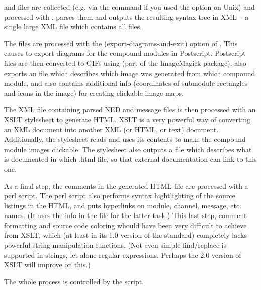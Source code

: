  and  files are collected (e.g. via the 
command if you used the  option on Unix) and processed
with .  parses them and outputs the resulting syntax
tree in XML -- a single large XML file which contains all files.

The  files are processed with the  (export-diagrams-and-exit)
option of . This causes  to export diagrams for the
compound modules in Postscript. Postscript files are then converted
to GIFs using  (part of the ImageMagick package).
 also exports an  file which describes which
image was generated from which compound module, and also contains
additional info (coordinates of submodule rectangles and icons in the image)
for creating clickable image maps.

The XML file containing parsed NED and message files is then processed
with an XSLT stylesheet to generate HTML. XSLT is a very powerful way
of converting an XML document into another XML (or HTML, or text) document.
Additionally, the stylesheet reads  and uses its contents
to make the compound module images clickable.
The stylesheet also outputs a  file which describes what is documented
in which .html file, so that external documentation can link to this one.

As a final step, the comments in the generated HTML file are processed
with a perl script. The perl script also performs syntax hightlighting
of the source listings in the HTML, and puts hyperlinks on module,
channel, message, etc. names. (It uses the info in the  file
for the latter task.) This last step, comment formatting and source code
coloring whould have been very difficult to achieve from XSLT, which
(at least in its 1.0 version of the standard) completely lacks powerful
string manipulation functions. (Not even simple find/replace
is supported in strings, let alone regular expressions. Perhaps the
2.0 version of XSLT will improve on this.)

The whole process is controlled by the  script.





